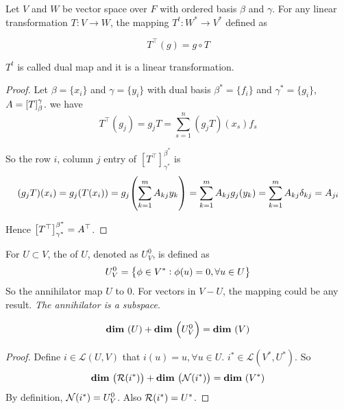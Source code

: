 \begin{theorem}
	Let $V$ and $W$ be vector space over $F$ with ordered basis $\beta$ and $\gamma$. For any linear transformation $T:V \rightarrow W$, the mapping $T^t: W^* \rightarrow V^*$ defined as 
	
	\begin{equation}
	    T^\top (g) = g \circ T
	\end{equation}
	
	$T^t$ is called dual map and it	is a linear transformation.	
\end{theorem}
\begin{proof}
	Let $\beta = \{x_i\}$ and $\gamma=\{y_i\}$ with dual basis $\beta^*=\{f_i\}$ and $\gamma^*=\{g_i\}$, $A=\coordinate{T}_\beta^\gamma$. we have
	\begin{equation*}
		T^\top (g_j) = g_j T = \sum_{s=1}^n (g_j T) (x_s) f_s
	\end{equation*}
	
	So the row $i$, column $j$ entry of $[T^\top]_{\gamma^*}^{\beta^*}$ is
	\begin{equation*}
	(g_j T)(x_i) = g_j (T(x_i))= g_j \mleft( \sum_{k=1}^m A_{kj} y_k \mright) = \sum_{k=1}^m A_{kj} g_j(y_k)= \sum_{k=1}^m A_{kj} \delta_{kj} = A_{ji}
	\end{equation*}
	
	Hence $\mleft[T^\top \mright]_{\gamma^*}^{\beta^*} = A^\top $.
\end{proof}

\begin{definition}
    For $U \subset V$, the  of $U$, denoted as $U^0_V$, is defined as
    \begin{equation*}
        U^0_V = \set{\phi \in V^*: \phi(u) = 0, \forall u \in U}
    \end{equation*}
    So the annihilator map $U$ to $0$. For vectors in $V - U$, the mapping could be any result. \emph{The annihilator is a subspace}.
\end{definition}

\begin{theorem}
    \begin{equation}
        \dimension{U} + \dimension{U_V^0} = \dimension{V}
    \end{equation}
\end{theorem}

\begin{proof}
    Define $i \in \mathcal{L}(U,V)$ that $i(u) = u, \forall u \in U$. $i^* \in \mathcal{L}(V^*,U^*)$. So
    \begin{equation*}
        \dimension{\rangespace{i^*} } +\dimension{\nullspace{i^*}} = \dimension{V^*}
    \end{equation*}
    By definition, $\nullspace{i^*} = U^0_V$. Also $\rangespace{i^*} = U^*$.
\end{proof}


